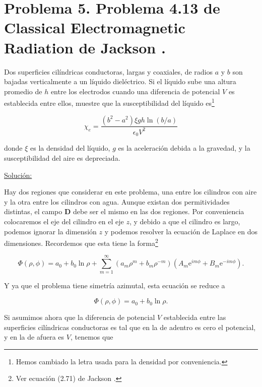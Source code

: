 \documentclass[a4paper,11pt]{article}
\numberwithin{equation}{section}
\newcommand{\euler}{\mathrm{e}}
\begin{document}
\newpage

\section{Problema 5. Problema 4.13 de Classical Electromagnetic Radiation
de Jackson \cite{jackson}.}

Dos superficies cilíndricas conductoras, largas y coaxiales, de radios $a$ y $b$ 
son bajadas verticalmente a un líquido dieléctrico. Si el líquido sube una altura 
promedio de $h$ entre los electrodos cuando una diferencia de potencial $V$ es 
establecida entre ellos, muestre que la susceptibilidad del líquido es\footnote{Hemos 
cambiado la letra usada para la densidad por conveniencia.}

$$
\chi_e = \frac{(b^2 - a^2)\xi g h \ln{(b/a)}}{\epsilon_0 V^2}
$$

donde $\xi$ es la densidad del líquido, $g$ es la aceleración debida a la gravedad, 
y la susceptibilidad del aire es depreciada.

\vspace{.3cm}

\underline{Solución:} \vspace{.3cm}

Hay dos regiones que considerar en este problema, una entre los cilindros con aire 
y la otra entre los cilindros con agua. Aunque existan dos permitividades distintas, 
el campo $\mathbf{D}$ debe ser el mismo en las dos regiones. Por conveniencia colocaremos 
el eje del cilindro en el eje $z$, y debido a que el cilindro es largo, podemos 
ignorar la dimensión $z$ y podemos resolver la ecuación de Laplace en dos dimensiones. 
Recordemos que esta tiene la forma\footnote{Ver ecuación (2.71) de Jackson \cite{jackson}.}

\begin{equation}
 \Phi(\rho,\phi) = a_0 + b_0 \ln{\rho} + \sum_{m=1}^\infty (a_m \rho^m + b_m \rho^{-m})
 (A_m \euler^{im\phi} + B_m \euler^{-im\phi}).
\end{equation}

Y ya que el problema tiene simetría azimutal, esta ecuación se reduce a 

\begin{equation}
 \Phi(\rho,\phi) = a_0 + b_0 \ln{\rho}.
\end{equation}

Si asumimos ahora que la diferencia de potencial $V$ establecida entre las superficies 
cilíndricas conductoras es tal que en la de adentro es cero el potencial, y en la 
de afuera es $V$, tenemos que 
\end{document}
